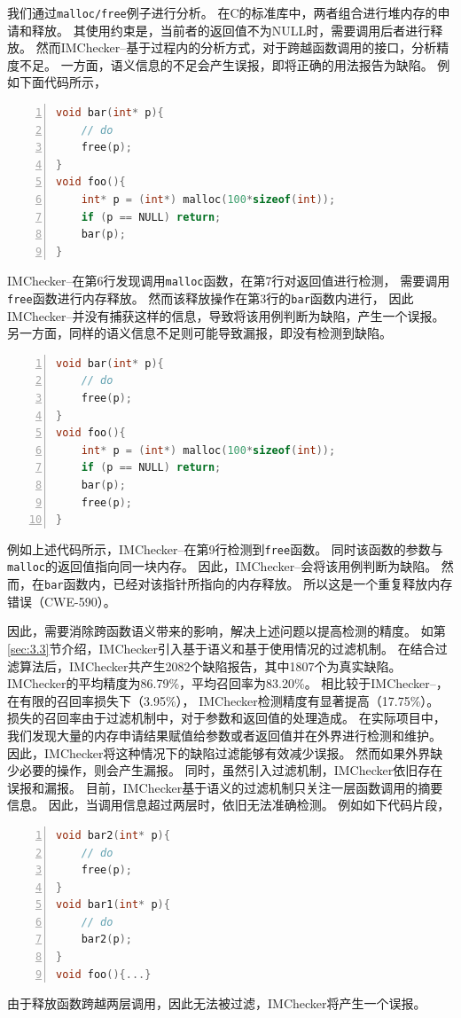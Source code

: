 我们通过\texttt{malloc/free}例子进行分析。
在C的标准库中，两者组合进行堆内存的申请和释放。
其使用约束是，当前者的返回值不为NULL时，需要调用后者进行释放。
然而IMChecker--基于过程内的分析方式，对于跨越函数调用的接口，分析精度不足。
一方面，语义信息的不足会产生误报，即将正确的用法报告为缺陷。
例如下面代码所示，
\begin{lstlisting}[language={C},
basicstyle=\linespread{0.7}\listingsfont,
numbers=left,
xleftmargin=.3\textwidth]
void bar(int* p){
	// do
	free(p);
}
void foo(){
	int* p = (int*) malloc(100*sizeof(int));
	if (p == NULL) return;
	bar(p);
}
\end{lstlisting}
IMChecker--在第6行发现调用\texttt{malloc}函数，在第7行对返回值进行检测，
需要调用\texttt{free}函数进行内存释放。
然而该释放操作在第3行的\texttt{bar}函数内进行，
因此IMChecker--并没有捕获这样的信息，导致将该用例判断为缺陷，产生一个误报。
另一方面，同样的语义信息不足则可能导致漏报，即没有检测到缺陷。
\begin{lstlisting}[language={C},
basicstyle=\linespread{0.7}\listingsfont,
numbers=left,
xleftmargin=.3\textwidth]
void bar(int* p){
	// do
	free(p);
}
void foo(){
	int* p = (int*) malloc(100*sizeof(int));
	if (p == NULL) return;
	bar(p);
	free(p);
}
\end{lstlisting}
例如上述代码所示，IMChecker--在第9行检测到\texttt{free}函数。
同时该函数的参数与\texttt{malloc}的返回值指向同一块内存。
因此，IMChecker--会将该用例判断为缺陷。
然而，在\texttt{bar}函数内，已经对该指针所指向的内存释放。
所以这是一个重复释放内存错误（CWE-590）。

因此，需要消除跨函数语义带来的影响，解决上述问题以提高检测的精度。
如第\ref{sec:3.3}节介绍，IMChecker引入基于语义和基于使用情况的过滤机制。
在结合过滤算法后，IMChecker共产生2082个缺陷报告，其中1807个为真实缺陷。
IMChecker的平均精度为86.79\%，平均召回率为83.20\%。
相比较于IMChecker--，在有限的召回率损失下（3.95\%），
IMChecker检测精度有显著提高（17.75\%）。
损失的召回率由于过滤机制中，对于参数和返回值的处理造成。
在实际项目中，我们发现大量的内存申请结果赋值给参数或者返回值并在外界进行检测和维护。
因此，IMChecker将这种情况下的缺陷过滤能够有效减少误报。
然而如果外界缺少必要的操作，则会产生漏报。
同时，虽然引入过滤机制，IMChecker依旧存在误报和漏报。
目前，IMChecker基于语义的过滤机制只关注一层函数调用的摘要信息。
因此，当调用信息超过两层时，依旧无法准确检测。
例如如下代码片段，
\begin{lstlisting}[language={C},
basicstyle=\linespread{0.7}\listingsfont,
numbers=left,
xleftmargin=.35\textwidth]
void bar2(int* p){        
	// do						   
	free(p);					  
}
void bar1(int* p){        
	// do						   
	bar2(p);					  
}
void foo(){...}
\end{lstlisting}
由于释放函数跨越两层调用，因此无法被过滤，IMChecker将产生一个误报。


